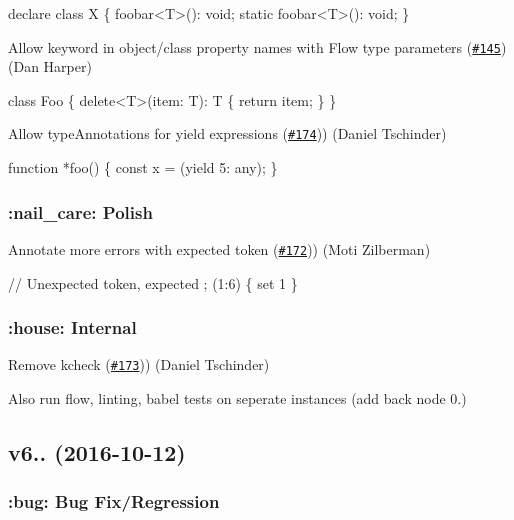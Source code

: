 \begin{DoxyCode}
declare class X \{
  foobar<T>(): void;
  static foobar<T>(): void;
\}
\end{DoxyCode}


Allow keyword in object/class property names with Flow type parameters (\href{https://github.com/babel/babylon/pull/145}{\tt \#145}) (Dan Harper)


\begin{DoxyCode}
class Foo \{
  delete<T>(item: T): T \{
    return item;
  \}
\}
\end{DoxyCode}


Allow type\+Annotations for yield expressions (\href{https://github.com/babel/babylon/pull/174}{\tt \#174})) (Daniel Tschinder)


\begin{DoxyCode}
function *foo() \{
  const x = (yield 5: any);
\}
\end{DoxyCode}


\subsubsection*{\+:nail\+\_\+care\+: Polish}

Annotate more errors with expected token (\href{https://github.com/babel/babylon/pull/172}{\tt \#172})) (Moti Zilberman)


\begin{DoxyCode}
// Unexpected token, expected ; (1:6)
\{ set 1 \}
\end{DoxyCode}


\subsubsection*{\+:house\+: Internal}

Remove kcheck (\href{https://github.com/babel/babylon/pull/173}{\tt \#173})) (Daniel Tschinder)

Also run flow, linting, babel tests on seperate instances (add back node 0.)

\subsection*{v6.. (2016-\/10-\/12)}

\subsubsection*{\+:bug\+: Bug Fix/\+Regression}


